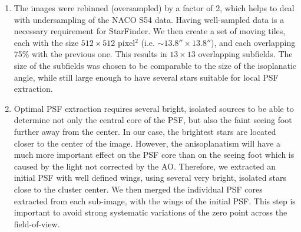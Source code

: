 \documentclass[a4paper,fleqn,usenatbib]{mnras}
\begin{document}
\begin{enumerate}
\item The images were rebinned (oversampled) by a factor of 2, which helps to deal with undersampling of the NACO S54 data. 
Having well-sampled data is a necessary requirement for {\sc StarFinder}.
We then create a set of moving tiles, each with the size $512 \times 512 $ pixel$^2$ (i.e. $\sim 13.8''\times 13.8''$), and each overlapping 75\%
with the previous one. This results in $13\times13$ overlapping subfields.
The size of the subfields was chosen
 to be comparable to the size of the isoplanatic angle, while still large enough to have several stars suitable for local PSF extraction. 

\item Optimal PSF extraction requires several bright, isolated sources to be able to determine not only the central core of the 
PSF, but also the faint seeing foot further away from the center. 
In our case, the brightest stars are located closer to the center of the image.
However, the anisoplanatism will have a much more important effect on the PSF core than on the seeing foot which is caused by the light not corrected by the AO. 
Therefore, we extracted an initial PSF with well defined wings, using several very bright, isolated stars close to the cluster center. We then merged the 
individual PSF cores extracted from each sub-image, with the wings of the initial PSF. 
This step is important to avoid strong systematic variations of the zero point across the field-of-view. 


\end{enumerate}
\end{document}
